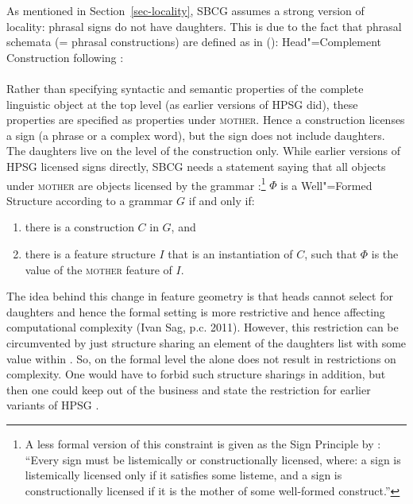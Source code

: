 \documentclass[output=paper]{langsci/langscibook}
\begin{document}
As mentioned in Section~\ref{sec-locality}, SBCG assumes a strong version of locality: phrasal
signs do not have daughters. This is due to the fact that phrasal schemata (= phrasal constructions)
are defined as in ():
\eas
Head"=Complement Construction following \citet[481]{SWB2003a}:\\
 \impl\\
\zs
Rather than specifying syntactic and semantic properties of the complete linguistic object at the
top level (as earlier versions of HPSG did), these properties are specified as properties under \textsc{mother}. Hence a construction
licenses a sign (a phrase or a complex word), but the sign does not include daughters. The daughters live on the level of the
construction only. While earlier versions of HPSG licensed signs directly, SBCG needs a statement
saying that all objects under \textsc{mother} are objects licensed by the grammar \citep*[]{SWB2003a}:\footnote{%
A less formal version of this constraint is given as the Sign Principle by
\citet[]{Sag2012a}: ``Every sign must be listemically or constructionally licensed, where: a
sign is listemically licensed only if it satisfies some listeme, and a sign is constructionally
licensed if it is the mother of some well-formed construct.''
}
\ea
\label{meta-construction-statemnet}
$\Phi$ is a Well"=Formed Structure according to a grammar $G$ if and only if:
\begin{enumerate}
\item there is a construction $C$ in $G$, and
\item there is a feature structure $I$ that is an instantiation of $C$, such that
      $\Phi$ is the value of the \textsc{mother} feature of $I$.
\end{enumerate}
\z
The idea behind this change in feature geometry is that heads cannot select for daughters and hence
the formal setting is more restrictive and hence affecting computational complexity (Ivan Sag,
p.c. 2011). However, this restriction can be circumvented by just structure sharing an element of
the daughters list with some value within \mother. So, on the formal level the \motherf alone does not
result in restrictions on complexity. One would have to forbid such structure sharings in addition,
but then one could keep \mother out of the business and state the restriction for earlier variants
of HPSG \citep[Section~10.6.2.1.3]{MuellerGT-Eng2}.
\end{document}
